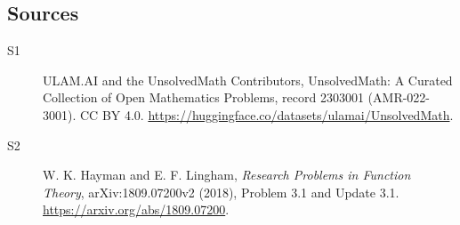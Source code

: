 \documentclass[11pt]{article}
\begin{document}
\subsection{Sources}
\begin{description}
\item[\hypertarget{source:2303001:1}{S1}] ULAM.AI and the UnsolvedMath Contributors, UnsolvedMath: A Curated Collection of Open Mathematics Problems, record 2303001 (AMR-022-3001). CC BY 4.0. \url{https://huggingface.co/datasets/ulamai/UnsolvedMath}.
\item[\hypertarget{source:2303001:2}{S2}] W. K. Hayman and E. F. Lingham, \emph{Research Problems in Function Theory}, arXiv:1809.07200v2 (2018), Problem 3.1 and Update 3.1. \url{https://arxiv.org/abs/1809.07200}.
\end{description}
\label{end:2303001}
\end{document}
